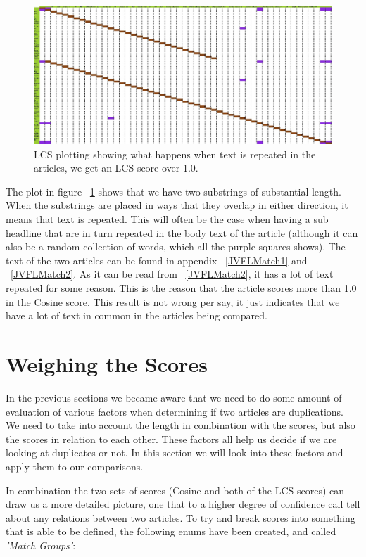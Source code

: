 \begin{figure}
	\centering
	\includegraphics[scale=0.35]{figures/Over}
	\caption{LCS plotting showing what happens when text is repeated in the articles, we get an LCS score over 1.0.}
	\label{Over100}
\end{figure}

The plot in figure ~\ref{Over100} shows that we have two substrings of substantial length. When the substrings are placed in ways that they overlap in either direction, it means that text is repeated. This will often be the case when having a sub headline that are in turn repeated in the body text of the article (although it can also be a random collection of words, which all the purple squares shows). The text of the two articles can be found in appendix ~\ref{JVFLMatch1} and ~\ref{JVFLMatch2}. As it can be read from ~\ref{JVFLMatch2}, it has a lot of text repeated for some reason. This is the reason that the article scores more than 1.0 in the Cosine score. This result is not wrong per say, it just indicates that we have a lot of text in common in the articles being compared.

\section{Weighing the Scores}
In the previous sections we became aware that we need to do some amount of evaluation of various factors when determining if two articles are duplications. We need to take into account the length in combination with the scores, but also the scores in relation to each other. These factors all help us decide if we are looking at duplicates or not. In this section we will look into these factors and apply them to our comparisons.

In combination the two sets of scores (Cosine and both of the LCS scores) can draw us a more detailed picture, one that to a higher degree of confidence call tell about any relations between two articles. To try and break scores into something that is able to be defined, the following enums have been created, and called \textit{'Match Groups'}:

